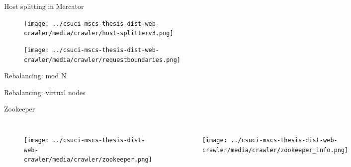 \documentclass[9pt]{beamer}
\begin{document}

\begin{frame}{Host splitting in Mercator}
  \begin{figure}
    \centering 
    \texttt{[image: ../csuci-mscs-thesis-dist-web-crawler/media/crawler/host-splitterv3.png]}
  \end{figure}

  \begin{figure}
    \centering
    \texttt{[image: ../csuci-mscs-thesis-dist-web-crawler/media/crawler/requestboundaries.png]}
  \end{figure}
\end{frame}


\begin{frame}{Rebalancing: mod N}
\end{frame}


\begin{frame}{Rebalancing: virtual nodes}
\end{frame}


\begin{frame}{Zookeeper}
  \begin{columns}[t]
    \begin{figure}
     \centering \texttt{[image: ../csuci-mscs-thesis-dist-web-crawler/media/crawler/zookeeper.png]}
   \end{figure}
   \begin{figure}
     \centering
     \texttt{[image: ../csuci-mscs-thesis-dist-web-crawler/media/crawler/zookeeper\_info.png]}
   \end{figure}
 \end{columns}
\end{frame}
\end{document}

